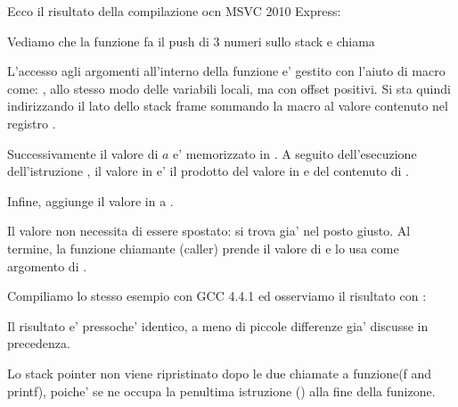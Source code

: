 

Ecco il risultato della compilazione ocn MSVC 2010 Express:




Vediamo che la funzione \main fa il push di 3 numeri sullo stack e chiama  

L'accesso agli argomenti all'interno della funzione \ttf e' gestito con l'aiuto di macro come: , 
allo stesso modo delle variabili locali, ma con offset positivi.
Si sta quindi indirizzando il lato  dello \gls{stack frame} sommando la macro  al valore contenuto nel registro \EBP.


Successivamente il valore di $a$ e' memorizzato in \EAX. A seguito dell'esecuzione dell'istruzione \IMUL, il valore in \EAX e' 
il \gls{prodotto} del valore in \EAX e del contenuto di .

Infine, \ADD aggiunge il valore in  a \EAX.

Il valore \EAX non necessita di essere spostato: si trova gia' nel posto giusto.
Al termine, la funzione chiamante (\gls{caller}) prende il valore di \EAX e lo usa come argomento di \printf.




Compiliamo lo stesso esempio con GCC 4.4.1 ed osserviamo il risultato con \IDA:



Il risultato e' pressoche' identico, a meno di piccole differenze gia' discusse in precedenza.

Lo \gls{stack pointer} non viene ripristinato dopo le due chiamate a funzione(f and printf), 
poiche' se ne occupa la penultima istruzione  () alla fine della funizone.
